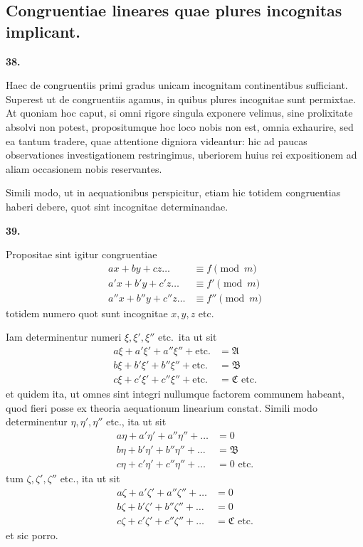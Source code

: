 \documentclass[12pt,a4paper]{article}
\theoremstyle{plain}
\theoremstyle{definition}
\theoremstyle{remark}
\begin{document}
\vspace{0.5em}
\subsection*{Congruentiae lineares quae plures incognitas implicant.}

\textbf{38.}

Haec de congruentiis primi gradus unicam incognitam continentibus sufficiant. Superest ut de congruentiis agamus, in quibus plures incognitae sunt permixtae. At quoniam hoc caput, si omni rigore singula exponere velimus, sine prolixitate absolvi non potest, propositumque hoc loco nobis non est, omnia exhaurire, sed ea tantum tradere, quae attentione digniora videantur: hic ad paucas observationes investigationem restringimus, uberiorem huius rei expositionem ad aliam occasionem nobis reservantes.

Simili modo, ut in aequationibus perspicitur, etiam hic totidem congruentias haberi debere, quot sint incognitae determinandae.

\textbf{39.}

Propositae sint igitur congruentiae
\begin{align*}
ax + by + cz \ldots &\equiv f \pmod{m} \tag{$A$} \\
a'x + b'y + c'z \ldots &\equiv f' \pmod{m} \tag{$A'$} \\
a''x + b''y + c''z \ldots &\equiv f'' \pmod{m} \tag{$A''$}
\end{align*}
totidem numero quot sunt incognitae $x, y, z$ etc.

Iam determinentur numeri $\xi, \xi', \xi''$ etc.\ ita ut sit
\begin{align*}
a\xi + a'\xi' + a''\xi'' + \text{etc.} &= \mathfrak{A} \\
b\xi + b'\xi' + b''\xi'' + \text{etc.} &= \mathfrak{B} \\
c\xi + c'\xi' + c''\xi'' + \text{etc.} &= \mathfrak{C} \text{ etc.}
\end{align*}
et quidem ita, ut omnes sint integri nullumque factorem communem habeant, quod fieri posse ex theoria aequationum linearium constat. Simili modo determinentur $\eta, \eta', \eta''$ etc., ita ut sit
\begin{align*}
a\eta + a'\eta' + a''\eta'' + \ldots &= 0 \\
b\eta + b'\eta' + b''\eta'' + \ldots &= \mathfrak{B} \\
c\eta + c'\eta' + c''\eta'' + \ldots &= 0 \text{ etc.}
\end{align*}
tum $\zeta, \zeta', \zeta''$ etc., ita ut sit
\begin{align*}
a\zeta + a'\zeta' + a''\zeta'' + \ldots &= 0 \\
b\zeta + b'\zeta' + b''\zeta'' + \ldots &= 0 \\
c\zeta + c'\zeta' + c''\zeta'' + \ldots &= \mathfrak{C} \text{ etc.}
\end{align*}
et sic porro.
\end{document}
